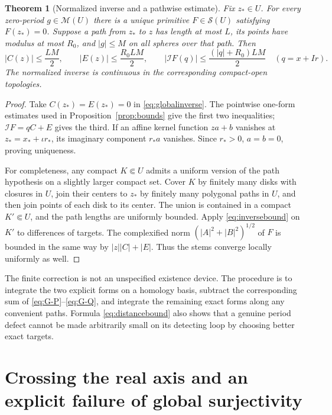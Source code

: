\documentclass[11pt,a4paper]{article}
\numberwithin{equation}{section}
\newtheorem{theorem}{Theorem}[section]
\theoremstyle{definition}
\theoremstyle{remark}
\newcommand{\cS}{\mathscr S}
\newcommand{\cM}{\mathscr M}
\newcommand{\cI}{\mathcal I}
\begin{document}
\begin{theorem}[Normalized inverse and a pathwise estimate]
\label{thm:stableinverse}
Fix $z_*\in U$. For every zero-period $g\in\cM(U)$ there is a unique
primitive $F\in\cS(U)$ satisfying $F(z_*)=0$.
Suppose a path from $z_*$ to $z$ has length at most $L$, its points have
modulus at most $R_0$, and $|g|\le M$ on all spheres over that path.
Then
\begin{equation}
 |C(z)|\le\frac{LM}{2},\qquad
 |E(z)|\le\frac{R_0LM}{2},\qquad
 |\cI F(q)|\le\frac{(|q|+R_0)LM}{2}
 \quad(q=x+Ir).
 \label{eq:inversebound}
\end{equation}
The normalized inverse is continuous in the corresponding compact-open
topologies.
\end{theorem}
\begin{proof}
Take $C(z_*)=E(z_*)=0$ in \eqref{eq:globalinverse}. The pointwise
one-form estimates used in Proposition~\ref{prop:bounds} give the first
two inequalities; $\cI F=qC+E$ gives the third. If an affine kernel
function $za+b$ vanishes at $z_*=x_*+\iota r_*$, its imaginary component
$r_*a$ vanishes. Since $r_*>0$, $a=b=0$, proving uniqueness.

For completeness, any compact $K\Subset U$ admits a uniform version of
the path hypothesis on a slightly larger compact set. Cover $K$ by
finitely many disks with closures in $U$, join their centers to $z_*$ by
finitely many polygonal paths in $U$, and then join points of each disk to
its center. The union is contained in a compact $K'\Subset U$, and the
path lengths are uniformly bounded. Apply \eqref{eq:inversebound} on
$K'$ to differences of targets. The complexified norm
$(|A|^2+|B|^2)^{1/2}$ of $F$ is bounded in the same way by
$|z||C|+|E|$. Thus the stems converge locally uniformly as well.
\end{proof}

The finite correction is not an unspecified existence device. The procedure
is to integrate the two explicit forms on a homology basis, subtract the
corresponding sum of \eqref{eq:G-P}--\eqref{eq:G-Q}, and integrate the
remaining exact forms along any convenient paths. Formula
\eqref{eq:distancebound} also shows that a genuine period defect cannot be
made arbitrarily small on its detecting loop by choosing better exact targets.

\section{Crossing the real axis and an explicit failure of global surjectivity}
\label{sec:realaxis}
\end{document}

